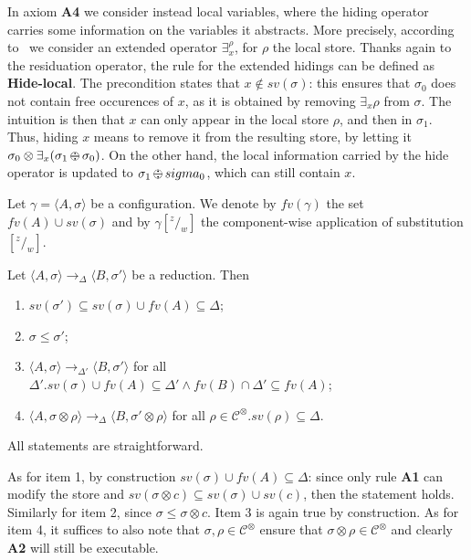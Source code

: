 \documentclass{llncs}
\def\C{{\mathcal C}}
\def\C{{\mathcal C}}
\def\odiv{\, {\ominus\hspace{-7.7pt} \div} \,}
\begin{document}
In axiom {\bf A4} we consider instead local variables, where the hiding operator carries some information on the variables it abstracts.
More precisely, according to~\cite{extendedHiding} we consider an extended operator $\exists_x^\rho$, for $\rho$ the local store.
Thanks again to the residuation operator, the rule for the extended hidings can be defined as {\bf Hide-local}. The precondition states that $x \not \in sv(\sigma)$: this ensures that $\sigma_0$ does not contain free occurences of $x$, as it is obtained by removing $\exists_x \rho$ from $\sigma$. The intuition is then that $x$ can only appear in the local store $\rho$, and then in $\sigma_1$. Thus, hiding $x$ means to remove it from the resulting store, by letting it $\sigma_0 \otimes \exists_x(\sigma_1 \odiv \sigma_0)$. On the other hand, the local information carried by the hide operator is updated to $\sigma_1 \odiv sigma_0$, which can still contain $x$. \\
\smallskip

Let $\gamma = \langle A, \sigma \rangle$ be a configuration.
%
We denote by $fv(\gamma)$ the set $fv(A) \cup sv(\sigma)$ and by
$\gamma[^z/_w]$ the component-wise application of substitution $[^z/_w]$.

\begin{lemma}[On monotonicity]
\label{mono}
Let $\langle A, \sigma \rangle \rightarrow_\Delta \langle B, \sigma' \rangle$ be a reduction. 
Then
\begin{enumerate}
\item $sv(\sigma') \subseteq sv(\sigma)\cup fv(A) \subseteq \Delta$;
\item $\sigma \leq \sigma'$;
\item $\langle A, \sigma \rangle \rightarrow_{\Delta'} \langle B, \sigma' \rangle$
         for all $\Delta'. sv(\sigma)\cup fv(A) \subseteq \Delta' \wedge fv(B) \cap \Delta' \subseteq fv(A)$;
\item $\langle A, \sigma \otimes \rho \rangle \rightarrow_\Delta \langle B, \sigma' \otimes \rho \rangle$
         for all $\rho \in  \C^\otimes. sv(\rho) \subseteq \Delta$. 
\end{enumerate}
 \end{lemma}
 
 All statements are straightforward. 

As for item 1, by construction $sv(\sigma)\cup fv(A) \subseteq \Delta$: since 
only rule {\bf A1} can modify the store
and $sv(\sigma \otimes c) \subseteq sv(\sigma) \cup sv(c)$, then the statement holds.
Similarly for item 2, since $\sigma \leq \sigma \otimes c$.
Item 3 is again true by construction. 
As for item 4, it suffices to also note that 
$\sigma, \rho \in  \C^\otimes$ ensure that $\sigma \otimes \rho \in  \C^\otimes$
and clearly {\bf A2} will still be executable. 
\end{document}
